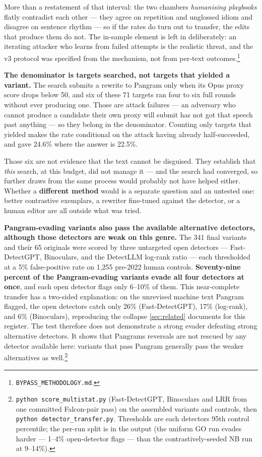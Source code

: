 More than a restatement of that interval: the two chambers\textquotesingle{} \emph{humanising
playbooks} flatly contradict each other --- they agree on repetition and
unglossed idiom and disagree on sentence rhythm --- so if the rates do turn out
to transfer, the edits that produce them do not. The in-sample element is left
in deliberately: an iterating attacker who learns from failed attempts is the
realistic threat,
and the v3 protocol was specified from the mechanism, not from per-text
outcomes.\footnote{\texttt{BYPASS\_METHODOLOGY.md}.}

\textbf{The denominator is targets searched, not targets that yielded a variant.}
The search submits a rewrite to Pangram only when its Opus proxy score drops
below 50, and six of these 71 targets ran four to six full rounds without ever
producing one. Those are attack failures --- an adversary who cannot produce a
candidate their own proxy will submit has not got that speech past anything ---
so they belong in the denominator. Counting only targets that yielded makes
the rate conditional on the attack having already half-succeeded, and gave
24.6\% where the answer is 22.5\%.

Those six are not evidence that the text cannot be disguised. They establish
that \emph{this} search, at this budget, did not manage it --- and the search had
converged, so further draws from the same process would probably not have
helped either. Whether a \textbf{different method} would is a separate question and
an untested one: better contrastive exemplars, a rewriter fine-tuned against
the detector, or a human editor are all outside what was tried.

\textbf{Pangram-evading variants also pass the available alternative detectors,
although those detectors are weak on this genre.} The 341 final variants and
their 65 originals were scored by three untargeted open detectors ---
Fast-DetectGPT, Binoculars, and the DetectLLM log-rank ratio --- each
thresholded at a 5\% false-positive rate on 1,255 pre-2022 human controls.
\textbf{Seventy-nine percent of the Pangram-evading variants evade all four
detectors at once}, and each open detector flags only 6--10\% of them. This
near-complete transfer has a two-sided explanation: on the unrevised machine
text Pangram flagged, the open detectors catch only 26\% (Fast-DetectGPT), 17\%
(log-rank), and 6\% (Binoculars), reproducing the collapse \cref{sec:related} documents for
this register. The test therefore does not demonstrate a strong evader
defeating strong alternative detectors. It shows that Pangram\textquotesingle s reversals are
not rescued by any detector available here: variants that pass Pangram
generally pass the weaker alternatives as well.\footnote{\texttt{python\ score\_\allowbreak{}multistat.\allowbreak{}py} (Fast-DetectGPT, Binoculars and LRR
  from one committed Falcon-pair pass) on the assembled variants and
  controls, then \texttt{python\ detector\_\allowbreak{}transfer.\allowbreak{}py}. Thresholds are each
  detector\textquotesingle s 95th control percentile; the per-run split is in the output
  (the uniform GO run evades harder --- 1--4\% open-detector flags --- than the
  contrastively-seeded NB run at 9--14\%).}

